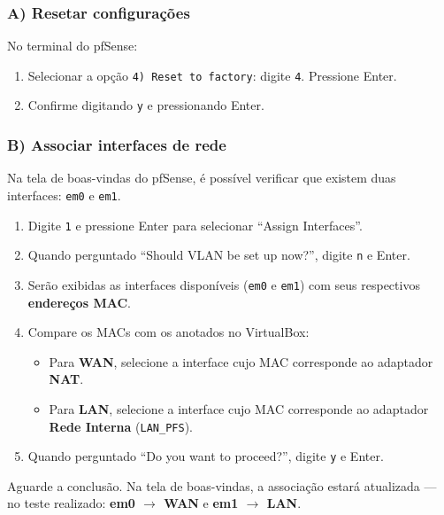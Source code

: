 \subsubsection*{A) Resetar configurações}

No terminal do pfSense:
\begin{enumerate}
  \item Selecionar a opção \texttt{4) Reset to factory}: digite \texttt{4}. Pressione Enter.
  \item Confirme digitando \texttt{y} e pressionando Enter.
\end{enumerate}


\subsubsection*{B) Associar interfaces de rede}

Na tela de boas-vindas do pfSense, é possível verificar que existem duas interfaces: \texttt{em0} e \texttt{em1}.


\begin{enumerate}
  \item Digite \texttt{1} e pressione Enter para selecionar ``Assign Interfaces''.
  \item Quando perguntado ``Should VLAN be set up now?'', digite \texttt{n} e Enter.
  \item Serão exibidas as interfaces disponíveis (\texttt{em0} e \texttt{em1}) com seus respectivos \textbf{endereços MAC}.
  \item Compare os MACs com os anotados no VirtualBox:
  \begin{itemize}
    \item Para \textbf{WAN}, selecione a interface cujo MAC corresponde ao adaptador \textbf{NAT}.
    \item Para \textbf{LAN}, selecione a interface cujo MAC corresponde ao adaptador \textbf{Rede Interna} (\texttt{LAN\_PFS}).
  \end{itemize}
  \item Quando perguntado ``Do you want to proceed?'', digite \texttt{y} e Enter.
\end{enumerate}


Aguarde a conclusão. Na tela de boas-vindas, a associação estará atualizada --- no teste realizado: \textbf{em0 $\rightarrow$ WAN} e \textbf{em1 $\rightarrow$ LAN}.

